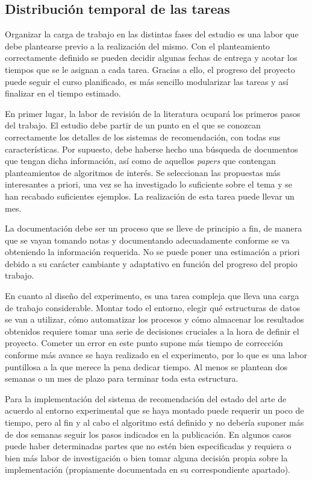 \subsection{Distribución temporal de las tareas}

Organizar la carga de trabajo en las distintas fases del estudio es una labor que debe plantearse previo a la realización del mismo. Con el planteamiento correctamente definido se pueden decidir algunas fechas de entrega y acotar los tiempos que se le asignan a cada tarea. Gracias a ello, el progreso del proyecto puede seguir el curso planificado, es más sencillo modularizar las tareas y así finalizar en el tiempo estimado.

En primer lugar, la labor de revisión de la literatura ocupará los primeros pasos del trabajo. El estudio debe partir de un punto en el que se conozcan correctamente los detalles de los sistemas de recomendación, con todas sus características. Por supuesto, debe haberse hecho una búsqueda de documentos que tengan dicha información, así como de aquellos \textit{papers} que contengan planteamientos de algoritmos de interés. Se seleccionan las propuestas más interesantes a priori, una vez se ha investigado lo suficiente sobre el tema y se han recabado suficientes ejemplos. La realización de esta tarea puede llevar un mes.

La documentación debe ser un proceso que se lleve de principio a fin, de manera que se vayan tomando notas y documentando adecuadamente conforme se va obteniendo la información requerida. No se puede poner una estimación a priori debido a su carácter cambiante y adaptativo en función del progreso del propio trabajo.

En cuanto al diseño del experimento, es una tarea compleja que lleva una carga de trabajo considerable. Montar todo el entorno, elegir qué estructuras de datos se van a utilizar, cómo automatizar los procesos y cómo almacenar los resultados obtenidos requiere tomar una serie de decisiones cruciales a la hora de definir el proyecto. Cometer un error en este punto supone más tiempo de corrección conforme más avance se haya realizado en el experimento, por lo que es una labor puntillosa a la que merece la pena dedicar tiempo. Al menos se plantean dos semanas o un mes de plazo para terminar toda esta estructura.

Para la implementación del sistema de recomendación del estado del arte de acuerdo al entorno experimental que se haya montado puede requerir un poco de tiempo, pero al fin y al cabo el algoritmo está definido y no debería suponer más de dos semanas seguir los pasos indicados en la publicación. En algunos casos puede haber determinadas partes que no estén bien especificadas y requiera o bien más labor de investigación o bien tomar alguna decisión propia sobre la implementación (propiamente documentada en su correspondiente apartado).


